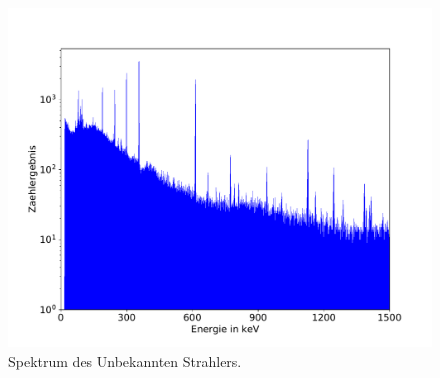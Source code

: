 \begin{figure}
  \centering
  \includegraphics[width=\textwidth]{python/plots/spec4}
  \caption{Spektrum des Unbekannten Strahlers.}
  \label{fig:spectrum_4}
\end{figure}



\FloatBarrier